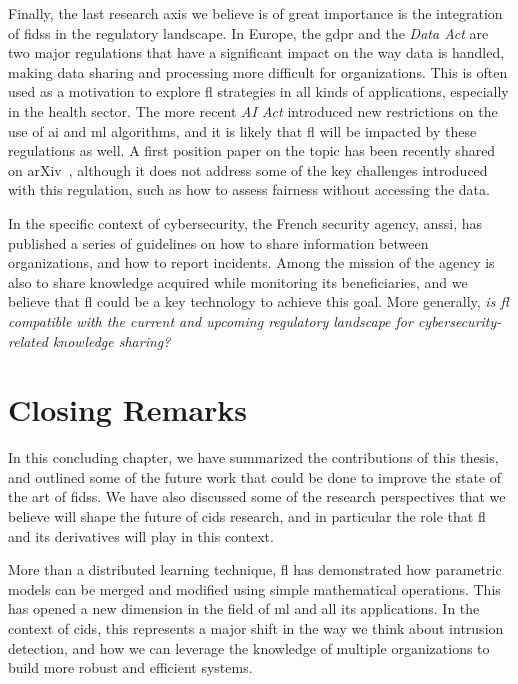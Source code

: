 Finally, the last research axis we believe is of great importance is the integration of \glspl{fids} in the regulatory landscape.
In Europe, the \gls{gdpr} and the \emph{Data Act} are two major regulations that have a significant impact on the way data is handled, making data sharing and processing more difficult for organizations.
This is often used as a motivation to explore \gls{fl} strategies in all kinds of applications, especially in the health sector.
The more recent \emph{AI Act} introduced new restrictions on the use of \gls{ai} and \gls{ml} algorithms, and it is likely that \gls{fl} will be impacted by these regulations as well.
A first position paper on the topic has been recently shared on arXiv~\cite{woisetschlager_FederatedLearningPriorities_2024}, although it does not address some of the key challenges introduced with this regulation, such as how to assess fairness without accessing the data.

In the specific context of cybersecurity, the French security agency, \gls{anssi}, has published a series of guidelines on how to share information between organizations, and how to report incidents.
Among the mission of the agency is also to share knowledge acquired while monitoring its beneficiaries, and we believe that \gls{fl} could be a key technology to achieve this goal.
More generally, \emph{is \gls{fl} compatible with the current and upcoming regulatory landscape for cybersecurity-related knowledge sharing?}


\section{Closing Remarks\label{sec:conclusion.closing}}

In this concluding chapter, we have summarized the contributions of this thesis, and outlined some of the future work that could be done to improve the state of the art of \glspl{fids}.
We have also discussed some of the research perspectives that we believe will shape the future of \gls{cids} research, and in particular the role that \gls{fl} and its derivatives will play in this context.

More than a distributed learning technique, \gls{fl} has demonstrated how parametric models can be merged and modified using simple mathematical operations.
This has opened a new dimension in the field of \gls{ml} and all its applications.
In the context of \gls{cids}, this represents a major shift in the way we think about intrusion detection, and how we can leverage the knowledge of multiple organizations to build more robust and efficient systems.
